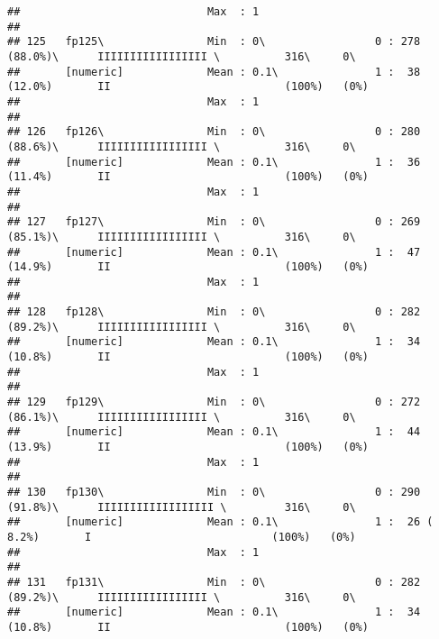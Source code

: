 \documentclass[]{article}
\begin{document}
\begin{verbatim}
##                             Max  : 1                                                                                       
## 
## 125   fp125\                Min  : 0\                 0 : 278 (88.0%)\      IIIIIIIIIIIIIIIII \          316\     0\       
##       [numeric]             Mean : 0.1\               1 :  38 (12.0%)       II                           (100%)   (0%)     
##                             Max  : 1                                                                                       
## 
## 126   fp126\                Min  : 0\                 0 : 280 (88.6%)\      IIIIIIIIIIIIIIIII \          316\     0\       
##       [numeric]             Mean : 0.1\               1 :  36 (11.4%)       II                           (100%)   (0%)     
##                             Max  : 1                                                                                       
## 
## 127   fp127\                Min  : 0\                 0 : 269 (85.1%)\      IIIIIIIIIIIIIIIII \          316\     0\       
##       [numeric]             Mean : 0.1\               1 :  47 (14.9%)       II                           (100%)   (0%)     
##                             Max  : 1                                                                                       
## 
## 128   fp128\                Min  : 0\                 0 : 282 (89.2%)\      IIIIIIIIIIIIIIIII \          316\     0\       
##       [numeric]             Mean : 0.1\               1 :  34 (10.8%)       II                           (100%)   (0%)     
##                             Max  : 1                                                                                       
## 
## 129   fp129\                Min  : 0\                 0 : 272 (86.1%)\      IIIIIIIIIIIIIIIII \          316\     0\       
##       [numeric]             Mean : 0.1\               1 :  44 (13.9%)       II                           (100%)   (0%)     
##                             Max  : 1                                                                                       
## 
## 130   fp130\                Min  : 0\                 0 : 290 (91.8%)\      IIIIIIIIIIIIIIIIII \         316\     0\       
##       [numeric]             Mean : 0.1\               1 :  26 ( 8.2%)       I                            (100%)   (0%)     
##                             Max  : 1                                                                                       
## 
## 131   fp131\                Min  : 0\                 0 : 282 (89.2%)\      IIIIIIIIIIIIIIIII \          316\     0\       
##       [numeric]             Mean : 0.1\               1 :  34 (10.8%)       II                           (100%)   (0%)     

\end{verbatim}
\end{document}
